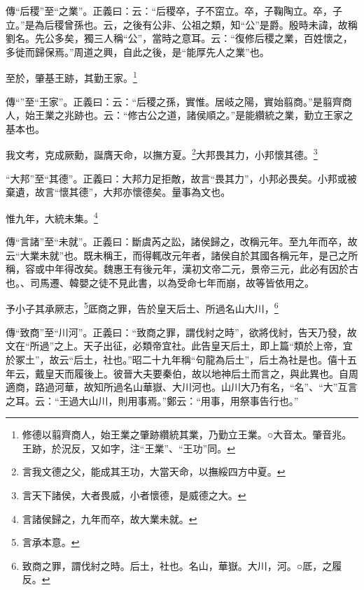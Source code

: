 {\noindent\zhuan{}\fzbyks 傳“后稷”至“之業”。正義曰：云：“后稷卒，子不窋立。卒，子鞠陶立。卒，子立。”是為后稷曾孫也。云，之後有公非、公祖之類，知“公”是爵。殷時未諱，故稱劉名。先公多矣，獨三人稱“公”，當時之意耳。云：“復修后稷之業，百姓懷之，多徙而歸保焉。”周道之興，自此之後，是“能厚先人之業”也。 \par}

至於，肇基王跡，其勤王家。\footnote{修德以翦齊商人，始王業之肇跡纘統其業，乃勤立王業。○大音太。肇音兆。王跡，於況反，又如字，注“王業”、“王功”同。}

{\noindent\shu{}\fzkt 傳“”至“王家”。正義曰：云：“后稷之孫，實惟。居岐之陽，實始翦商。”是翦齊商人，始王業之兆跡也。云：“修古公之道，諸侯順之。”是能纘統之業，勤立王家之基本也。 \par}

我文考，克成厥勳，誕膺天命，以撫方夏。\footnote{言我文德之父，能成其王功，大當天命，以撫綏四方中夏。}大邦畏其力，小邦懷其德。\footnote{言天下諸侯，大者畏威，小者懷德，是威德之大。}

{\noindent\shu{}\fzkt “大邦”至“其德”。正義曰：大邦力足拒敵，故言“畏其力”，小邦必畏矣。小邦或被棄遺，故言“懷其德”，大邦亦懷德矣。量事為文也。 \par}

惟九年，大統未集。\footnote{言諸侯歸之，九年而卒，故大業未就。}

{\noindent\zhuan{}\fzbyks 傳“言諸”至“未就”。正義曰：斷虞芮之訟，諸侯歸之，改稱元年。至九年而卒，故云“大業未就”也。既未稱王，而得輒改元年者，諸侯自於其國各稱元年，是己之所稱，容或中年得改矣。魏惠王有後元年，漢初文帝二元，景帝三元，此必有因於古也。、司馬遷、韓嬰之徒不見此書，以為受命七年而崩，故等皆依用之。 \par}

予小子其承厥志，\footnote{言承本意。}厎商之罪，告於皇天后土、所過名山大川，\footnote{致商之罪，謂伐紂之時。后土，社也。名山，華嶽。大川，河。○厎，之履反。}

{\noindent\zhuan{}\fzbyks 傳“致商”至“川河”。正義曰：“致商之罪，謂伐紂之時”，欲將伐紂，告天乃發，故文在“所過”之上。天子出征，必類帝宜社。此告皇天后土，即上篇“類於上帝，宜於冢土”，故云“后土，社也。”昭二十九年稱“句龍為后土”，后土為社是也。僖十五年云，戴皇天而履後上。彼晉大夫要秦伯，故以地神后土而言之，與此異也。自周適商，路過河華，故知所過名山華嶽、大川河也。山川大乃有名，“名”、“大”互言之耳。云：“王過大山川，則用事焉。”鄭云：“用事，用祭事告行也。” \par}

